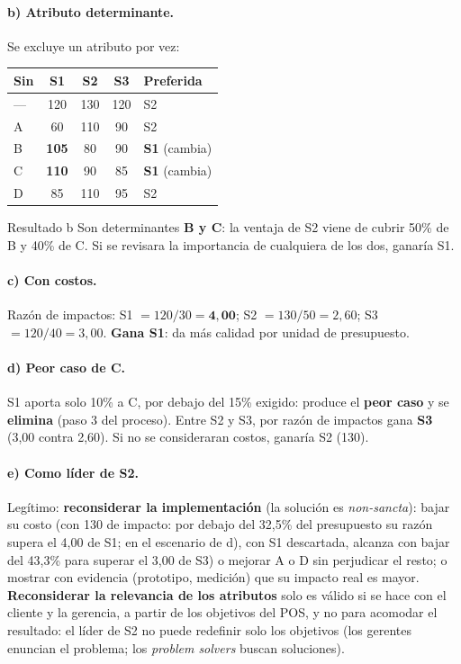 \documentclass[11pt,a4paper]{article}
\begin{document}
\paragraph{b) Atributo determinante.} Se excluye un atributo por vez:
\begin{center}\small
\begin{tabular}{lcccl}
\toprule
Sin & S1 & S2 & S3 & Preferida\\
\midrule
--- & 120 & 130 & 120 & S2\\
A & 60 & 110 & 90 & S2\\
B & \textbf{105} & 80 & 90 & \textbf{S1} (cambia)\\
C & \textbf{110} & 90 & 85 & \textbf{S1} (cambia)\\
D & 85 & 110 & 95 & S2\\
\bottomrule
\end{tabular}
\end{center}
\begin{resultado}{Resultado b}
Son determinantes \textbf{B y C}: la ventaja de S2 viene de cubrir 50\% de B y 40\% de C. Si se revisara la
importancia de cualquiera de los dos, ganaría S1.
\end{resultado}

\paragraph{c) Con costos.} Razón de impactos: S1 $= 120/30 = \mathbf{4{,}00}$; S2 $= 130/50 = 2{,}60$; S3 $=
120/40 = 3{,}00$. \textbf{Gana S1}: da más calidad por unidad de presupuesto.

\paragraph{d) Peor caso de C.} S1 aporta solo 10\% a C, por debajo del 15\% exigido: produce el \textbf{peor
caso} y se \textbf{elimina} (paso 3 del proceso). Entre S2 y S3, por razón de impactos gana \textbf{S3} (3,00
contra 2,60). Si no se consideraran costos, ganaría S2 (130).

\paragraph{e) Como líder de S2.} Legítimo: \textbf{reconsiderar la implementación} (la solución es
\emph{non-sancta}): bajar su costo (con 130 de impacto: por debajo del 32,5\% del presupuesto su razón supera el 4,00 de S1; en el escenario de d), con S1 descartada, alcanza con bajar del 43,3\% para superar el 3,00 de S3) o mejorar
A o D sin perjudicar el resto; o mostrar con evidencia (prototipo, medición) que su impacto real es mayor.
\textbf{Reconsiderar la relevancia de los atributos} solo es válido si se hace con el cliente y la gerencia, a
partir de los objetivos del POS, y no para acomodar el resultado: el líder de S2 no puede redefinir solo los
objetivos (los gerentes enuncian el problema; los \emph{problem solvers} buscan soluciones).
\end{document}
